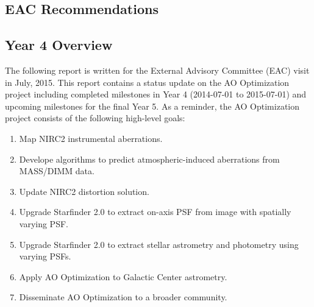\subsection{EAC Recommendations}

\subsection{Year 4 Overview}
The following report is written for the External Advisory Committee (EAC) visit in July, 2015. This report contains a status update on the AO Optimization project including completed milestones in Year 4 (2014-07-01 to 2015-07-01) and upcoming milestones for the final Year 5. As a reminder, the AO Optimization project consists of the following high-level goals:
\begin{enumerate}
\item Map NIRC2 instrumental aberrations.
\item Develope algorithms to predict atmospheric-induced aberrations from MASS/DIMM data.
\item Update NIRC2 distortion solution.
\item Upgrade Starfinder 2.0 to extract on-axis PSF from image with spatially varying PSF.
\item Upgrade Starfinder 2.0 to extract stellar astrometry and photometry using varying PSFs.
\item Apply AO Optimization to Galactic Center astrometry.
\item Disseminate AO Optimization to a broader community.
\end{enumerate}




    
    
    
    
    
    
    
  
  
  